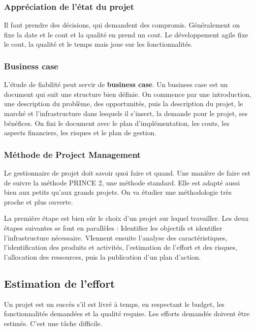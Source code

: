 \subsubsection{Appréciation de l'état du projet}
Il faut prendre des décisions, qui demandent des compromis. Généralement on fixe la date et le cout et la qualité en prend un cout. Le développement agile fixe le cout, la qualité et le temps mais joue sur les fonctionnalités.



\subsubsection{Business case}
L’étude de fiabilité peut servir de \textbf{business case}.
Un business case est un document qui suit une structure bien définie. On commence par une introduction, une description du problème, des opportunités, puis la description du projet, le marché et l’infrastructure dans lesquels il s’insert, la demande pour le projet, ses bénéfices.
On fini le document avec le plan d’implémentation, les couts, les aspects financiers, les risques et le plan de gestion.



\subsubsection{Méthode de Project Management}
Le gestionnaire de projet doit savoir quoi faire et quand.
Une manière de faire est de suivre la méthode PRINCE 2, une méthode standard. Elle est adapté aussi bien aux petits qu’aux grands projets.
On va étudier une méthodologie très proche et plus ouverte.

La première étape est bien sûr le choix d’un projet sur lequel travailler. Les deux étapes suivantes se font en parallèles : Identifier les objectifs et identifier l’infrastructure nécessaire. VIennent ensuite l’analyse des caractéristiques, l’identification des produits et activités, l’estimation de l’effort et des risques, l’allocation des ressources, puis la publication d’un plan d’action.



\subsection{Estimation de l’effort}
Un projet est un succès s’il est livré à temps, en respectant le budget, les fonctionnalités demandées et la qualité requise.
Les efforts demandés doivent être estimés. C’est une tâche difficile.

